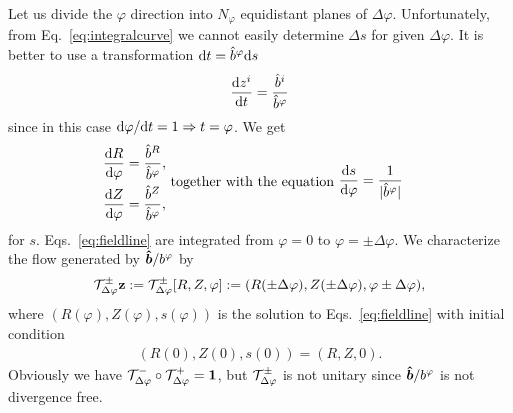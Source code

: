 Let us divide the $\varphi$ direction into $N_\varphi$ equidistant planes of 
$\Delta \varphi$. Unfortunately, from Eq.~\eqref{eq:integralcurve} we cannot easily determine
$\Delta s$ for given $\Delta \varphi$. It is better to use a transformation $\mathrm{d} t = \hat b^\varphi \mathrm{d} s$
\begin{align}
    \frac{\mathrm{d} z^i}{\mathrm{d} t} = \frac{\hat b^i}{\hat b^\varphi}
    \label{}
\end{align}
since in this case $\mathrm{d}\varphi/\mathrm{d} t = 1 \Rightarrow t=\varphi$. We get
\begin{subequations}
\begin{align}
    \frac{\d R}{\d\varphi}&= \frac{\hat b^R}{\hat b^\varphi},\\ %
    \frac{\d Z}{\d\varphi}&=\frac{\hat b^Z}{\hat b^\varphi},%
\end{align}
\text{ together with the equation  }
\begin{align}
    \frac{\d s}{\d\varphi} &= \frac{1}{|\hat b^\varphi|} %
    \label{eq:fieldlinec}
\end{align}
\label{eq:fieldline}
\end{subequations}
for $s$. 
Eqs.~\eqref{eq:fieldline} are integrated from $\varphi=0$ to $\varphi=\pm \Delta \varphi$. 
We characterize the flow generated by $\bm{\hat{b}}/b^\varphi$ by
\begin{align}
    \mathcal T^\pm_{\Delta\varphi}{\mathbf{z}} := \mathcal T^\pm_{\Delta\varphi}[R, Z, \varphi]:= ( R(\pm \Delta\varphi), Z( \pm \Delta\varphi), \varphi\pm\Delta \varphi),
    \label{}
\end{align}
where $(R(\varphi), Z(\varphi), s(\varphi))$ is the solution to Eqs.~\eqref{eq:fieldline} 
with initial condition 
\begin{align}
    (R(0), Z(0), s(0)) = (R, Z, 0).
    \label{}
\end{align} 
Obviously we have $\mathcal T^-_{\Delta\varphi}\circ\mathcal T^+_{\Delta\varphi} = \mathbf{1}$, but $\mathcal T^\pm_{\Delta\varphi}$ is not unitary since $\bm{\hat{b}}/b^\varphi$ is 
not divergence free. 


